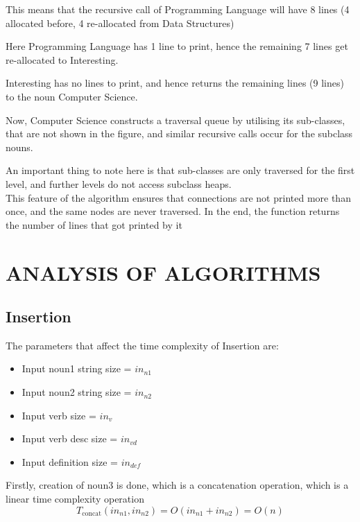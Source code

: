 \documentclass[conference]{IEEEtran}
\begin{document}
This means that the recursive call of Programming Language will have 8 lines (4 allocated before, 4 re-allocated from Data Structures)

Here Programming Language has 1 line to print, hence the remaining 7 lines get re-allocated to Interesting.

Interesting has no lines to print, and hence returns the remaining lines (9 lines) to the noun Computer Science.

Now, Computer Science constructs a traversal queue by utilising its sub-classes, that are not shown in the figure, and similar recursive calls occur for the subclass nouns.

An important thing to note here is that sub-classes are only traversed for the first level, and further levels do not access subclass heaps.\\

This feature of the algorithm ensures that connections are not printed more than once, and the same nodes are never traversed.
In the end, the function returns the number of lines that got printed by it

\section{ANALYSIS OF ALGORITHMS}
\subsection{Insertion}
The parameters that affect the time complexity of Insertion are:
\begin{itemize}
    \item Input noun1 string size = $in_{n1}$
    \item Input noun2 string size = $in_{n2}$
    \item Input verb size = $in_{v}$
    \item Input verb desc size = $in_{vd}$
    \item Input definition size = $in_{def}$
\end{itemize}

Firstly, creation of noun3 is done, which is a concatenation operation, which is a linear time complexity operation
\\
\begin{equation}
	T_{\text{concat}}(in_{n1}, in_{n2}) = O(in_{n1} + in_{n2}) = O(n)
\end{equation}
\end{document}
